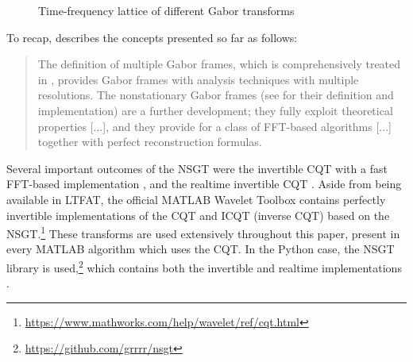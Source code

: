 \documentclass[letter,12pt,notitlepage]{article}
\begin{document}
\begin{figure}[ht]
	\centering
	\hspace{0.35em}
	\hspace{0.35em}
	\caption{Time-frequency lattice of different Gabor transforms}
	\label{fig:nsgts}
\end{figure}

To recap, \citet{adaptivecqt} describes the concepts presented so far as follows:

\begin{quote}
	The definition of multiple Gabor frames, which is comprehensively treated in \cite{doerflerphd}, provides Gabor frames with analysis techniques with multiple resolutions. The nonstationary Gabor frames (see \cite{balazs, jaillet} for their definition and implementation) are a further development; they fully exploit theoretical properties [...], and they provide for a class of FFT-based algorithms [...] together with perfect reconstruction formulas.
\end{quote}

Several important outcomes of the NSGT were the invertible CQT with a fast FFT-based implementation \cite{invertiblecqt}, and the realtime invertible CQT \cite{rtcqt}. Aside from being available in LTFAT, the official MATLAB Wavelet Toolbox contains perfectly invertible implementations of the CQT and ICQT (inverse CQT) based on the NSGT.\footnote{\url{https://www.mathworks.com/help/wavelet/ref/cqt.html}} These transforms are used extensively throughout this paper, present in every MATLAB algorithm which uses the CQT. In the Python case, the NSGT library is used,\footnote{\url{https://github.com/grrrr/nsgt}} which contains both the invertible and realtime implementations \cite{invertiblecqt, rtcqt}.
\end{document}

